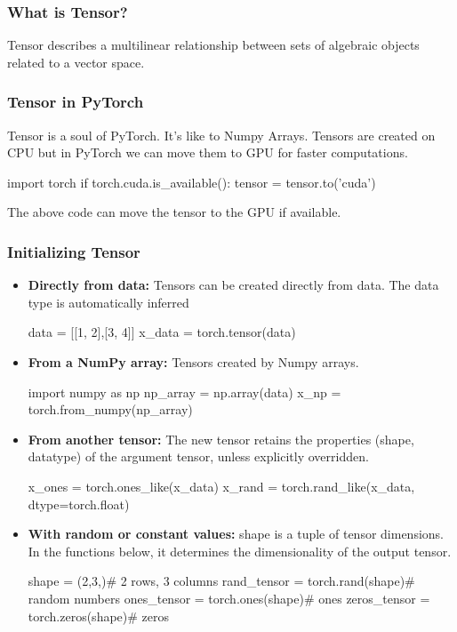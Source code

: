 \documentclass[12pt,hyperref,a4paper,UTF8]{article}
\begin{document}
\subsubsection{What is Tensor?}
\textbf{} Tensor describes a multilinear relationship between sets of algebraic objects related to a vector space.
\subsubsection{Tensor in PyTorch}
\textbf{} Tensor is a soul of PyTorch. It's like to Numpy Arrays. Tensors are created on CPU but in PyTorch we can move them to GPU for faster computations.
\begin{python}
    import torch
    if torch.cuda.is_available():
    tensor = tensor.to('cuda')
\end{python}
The above code can move the tensor to the GPU if available.

\subsubsection{Initializing Tensor}
\begin{itemize}
    \item \textbf{Directly from data:} Tensors can be created directly from data. The data type is automatically inferred
          \begin{python}
              data = [[1, 2],[3, 4]]
              x_data = torch.tensor(data)
          \end{python}
    \item \textbf{From a NumPy array:} Tensors created by Numpy arrays.
          \begin{python}
              import numpy as np
              np_array = np.array(data)
              x_np = torch.from_numpy(np_array)
          \end{python}
    \item \textbf{From another tensor:} The new tensor retains the properties (shape, datatype) of the argument tensor, unless explicitly overridden.
          \begin{python}
              x_ones = torch.ones_like(x_data)
              x_rand = torch.rand_like(x_data, dtype=torch.float)
          \end{python}
    \item \textbf{With random or constant values:} shape is a tuple of tensor dimensions. In the functions below, it determines the dimensionality of the output tensor.
          \begin{python}
              shape = (2,3,)# 2 rows, 3 columns
              rand_tensor = torch.rand(shape)# random numbers
              ones_tensor = torch.ones(shape)# ones
              zeros_tensor = torch.zeros(shape)# zeros
          \end{python}
\end{itemize}
\end{document}
